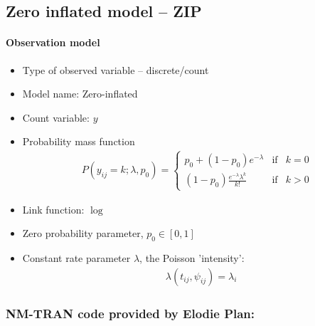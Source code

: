 \subsection{Zero inflated model -- ZIP}
\label{subsec:ZIPmodel}

\paragraph{Observation model}

\begin{itemize}
\item
Type of observed variable -- discrete/count
\item
Model name: Zero-inflated
\item
Count variable: $y$
\item
Probability mass function
\begin{align}
& P(y_{ij} = k; \lambda, p_0) =  \left\{ \begin{array}{rcl} p_0 + (1-p_0) e^{-\lambda} & \mbox{if} & k = 0 \\ 
(1-p_0)\frac{e^{-\lambda}\lambda^k}{k!} & \mbox{if} & k > 0 \end{array}\right. \nonumber
\end{align}
\item
Link function: $\log$
\item
Zero probability parameter, $p_0 \in [0,1]$
\item
Constant rate parameter $\lambda$, the Poisson 'intensity': 
\begin{eqnarray}
&& \lambda(t_{ij}, \psi_{ij}) = \lambda_{i} \nonumber
\end{eqnarray}
\end{itemize}

\subsubsection{NM-TRAN code provided by Elodie Plan:}

\myStartLine

